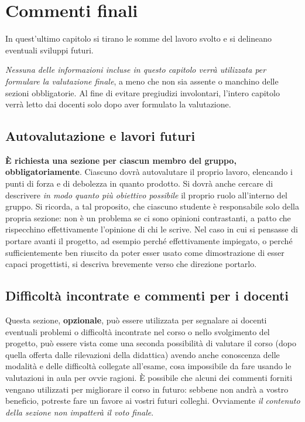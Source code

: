 \documentclass[a4paper,12pt]{report}
\begin{document}
	
	\chapter{Commenti finali}
	
	In quest'ultimo capitolo si tirano le somme del lavoro svolto e si delineano eventuali sviluppi
	futuri.
	
	\textit{Nessuna delle informazioni incluse in questo capitolo verrà utilizzata per formulare la valutazione finale}, a meno che non sia assente o manchino delle sezioni obbligatorie.
	Al fine di evitare pregiudizi involontari, l'intero capitolo verrà letto dai docenti solo dopo aver formulato la valutazione.
	
	\section{Autovalutazione e lavori futuri}
	
	\textbf{È richiesta una sezione per ciascun membro del gruppo, obbligatoriamente}.
	Ciascuno dovrà autovalutare il proprio lavoro, elencando i punti di forza e di debolezza in quanto prodotto.
	Si dovrà anche cercare di descrivere \emph{in modo quanto più obiettivo possibile} il proprio ruolo all'interno del gruppo.
	Si ricorda, a tal proposito, che ciascuno studente è responsabile solo della propria sezione: non è un problema se ci sono opinioni contrastanti, a patto che rispecchino effettivamente l'opinione di chi le scrive.
	Nel caso in cui si pensasse di portare avanti il progetto, ad esempio perché effettivamente impiegato, o perché sufficientemente ben riuscito da poter esser usato come dimostrazione di esser capaci progettisti, si descriva brevemente verso che direzione portarlo.
	
	\section{Difficoltà incontrate e commenti per i docenti}
	
	Questa sezione, \textbf{opzionale}, può essere utilizzata per segnalare ai docenti eventuali problemi o difficoltà incontrate nel corso o nello svolgimento del progetto, può essere vista come una seconda possibilità di valutare il corso (dopo quella offerta dalle rilevazioni della didattica) avendo anche conoscenza delle modalità e delle difficoltà collegate all'esame, cosa impossibile da fare usando le valutazioni in aula per ovvie ragioni.
	È possibile che alcuni dei commenti forniti vengano utilizzati per migliorare il corso in futuro: sebbene non andrà a vostro beneficio, potreste fare un favore ai vostri futuri colleghi.
	Ovviamente \textit{il contenuto della sezione non impatterà il voto finale}.
	
\end{document}
